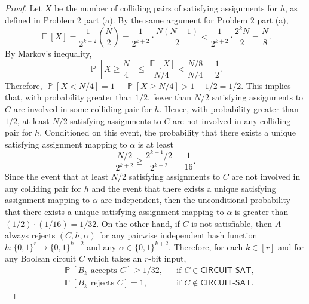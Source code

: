 \documentclass[letterpaper, reqno,11pt]{article}
\newcommand{\PP}{\mathop{{}\mathbb{P}}}
\newcommand{\EE}{\mathop{{}\mathbb{E}}}
\begin{document}
\begin{enumerate}
\begin{proof}
    Let $X$ be the number of colliding pairs of satisfying assignments for $h$, as defined in Problem 2 part (a). By the same argument for Problem 2 part (a),
    $$ \EE[X]  = \frac{1}{2^{k + 2}} \binom{N}{2} = \frac{1}{2^{k + 2}} \cdot \frac{N(N - 1)}{2} < \frac{1}{2^{k + 2}} \cdot \frac{2^k N}{2} = \frac{N}{8}. $$
    By Markov's inequality,
    $$ \PP\left[X \geq \frac{N}{4}\right] \leq \frac{\EE[X]}{N/4} < \frac{N/8}{N/4} = \frac{1}{2}. $$
    Therefore, $\PP[X < N/4] = 1 - \PP[X \geq N/4] > 1 - 1/2 = 1/2$. This implies that, with probability greater than $1/2$, fewer than $N/2$ satisfying assignments to $C$ are involved in some colliding pair for $h$. Hence, with probability greater than $1/2$, at least $N/2$ satisfying assignments to $C$ are not involved in any colliding pair for $h$. Conditioned on this event, the probability that there exists a unique satisfying assignment mapping to $\alpha$ is at least
    $$ \frac{N/2}{2^{k + 2}} \geq \frac{2^{k - 1}/2}{2^{k + 2}} = \frac{1}{16}. $$
    Since the event that at least $N/2$ satisfying assignments to $C$ are not involved in any colliding pair for $h$ and the event that there exists a unique satisfying assignment mapping to $\alpha$ are independent, then the unconditional probability that there exists a unique satisfying assignment mapping to $\alpha$ is greater than $(1/2) \cdot (1/16) = 1/32$.
    On the other hand, if $C$ is not satisfiable, then $A$ always rejects $(C, h, \alpha)$ for any pairwise independent hash function $h : \{ 0, 1 \}^r \to \{ 0, 1 \}^{k + 2}$ and any $\alpha \in \{ 0, 1 \}^{k + 2}$. Therefore, for each $k \in [r]$ and for any Boolean circuit $C$ which takes an $r$-bit input,
    \begin{align*}
      & \PP\left[\text{$B_k$ accepts $C$}\right] \geq 1/32, && \text{if $C \in \textsf{CIRCUIT-SAT}$}, \\
      & \PP\left[\text{$B_k$ rejects $C$}\right] = 1, && \text{if $C \not \in \textsf{CIRCUIT-SAT}$}.
    \end{align*}


\end{proof}
\end{enumerate}
\end{document}
